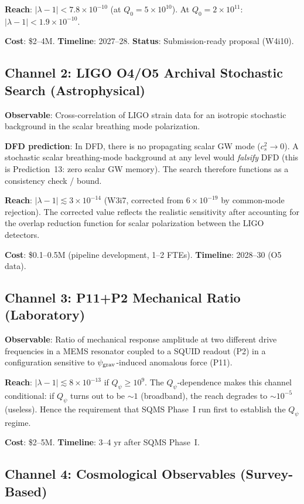 \documentclass[11pt]{article}
\newcommand{\ee}[1]{\times 10^{#1}}
\begin{document}
\textbf{Reach}: $|\lambda-1| < 7.8\ee{-10}$ (at $Q_0 = 5\ee{10}$).
At $Q_0 = 2\ee{11}$: $|\lambda-1| < 1.9\ee{-10}$.

\textbf{Cost}: \$2--4M. \textbf{Timeline}: 2027--28.
\textbf{Status}: Submission-ready proposal (W4i10).

\subsection{Channel 2: LIGO O4/O5 Archival Stochastic Search (Astrophysical)}

\textbf{Observable}: Cross-correlation of LIGO strain data for an isotropic
stochastic background in the scalar breathing mode polarization.

\textbf{DFD prediction}: In DFD, there is no propagating scalar GW mode
($c_s^2 \to 0$). A stochastic scalar breathing-mode background at any
level would \emph{falsify} DFD (this is Prediction~13: zero scalar GW
memory). The search therefore functions as a consistency check / bound.

\textbf{Reach}: $|\lambda-1| \lesssim 3\ee{-14}$ (W3i7, corrected from
$6\ee{-19}$ by common-mode rejection). The corrected value reflects the
realistic sensitivity after accounting for the overlap reduction function
for scalar polarization between the LIGO detectors.

\textbf{Cost}: \$0.1--0.5M (pipeline development, 1--2 FTEs).
\textbf{Timeline}: 2028--30 (O5 data).

\subsection{Channel 3: P11+P2 Mechanical Ratio (Laboratory)}

\textbf{Observable}: Ratio of mechanical response amplitude at two
different drive frequencies in a MEMS resonator coupled to a SQUID
readout (P2) in a configuration sensitive to $\psi_{\rm grav}$-induced
anomalous force (P11).

\textbf{Reach}: $|\lambda-1| \lesssim 8\ee{-13}$ if $Q_\psi \geq 10^9$.
The $Q_\psi$-dependence makes this channel conditional: if $Q_\psi$ turns
out to be $\sim 1$ (broadband), the reach degrades to $\sim 10^{-5}$
(useless). Hence the requirement that SQMS Phase~I run first to
establish the $Q_\psi$ regime.

\textbf{Cost}: \$2--5M. \textbf{Timeline}: 3--4 yr after SQMS Phase~I.

\subsection{Channel 4: Cosmological Observables (Survey-Based)}
\end{document}
